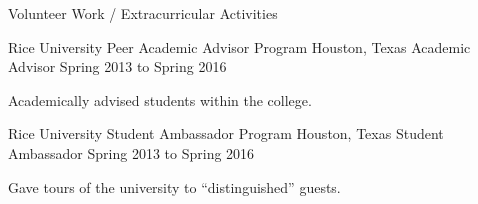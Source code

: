 \documentclass{resume}
\begin{document}
\begin{rSection}{Volunteer Work / Extracurricular Activities}
{    \begin{rSubSection}
    {Rice University Peer Academic Advisor Program}
    {Houston, Texas}
    {Academic Advisor}
    {Spring 2013 to Spring 2016}%
    \item Academically advised students within the college.
    \end{rSubSection}

    \begin{rSubSection}
    {Rice University Student Ambassador Program}
    {Houston, Texas}
    {Student Ambassador}
    {Spring 2013 to Spring 2016}%
    \item Gave tours of the university to ``distinguished'' guests.
    \end{rSubSection}

  }{}

\end{rSection}
\end{document}
